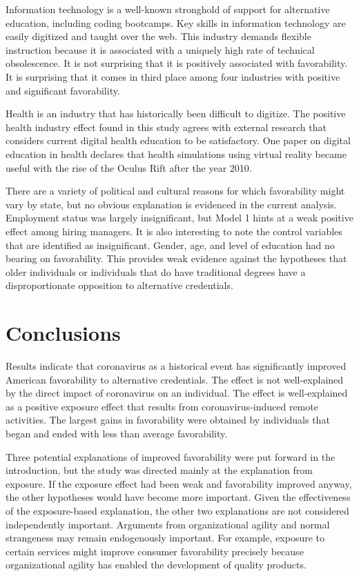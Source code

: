 \documentclass[review]{elsarticle}
\begin{document}
Information technology is a well-known stronghold of support for alternative education, including coding bootcamps.
Key skills in information technology are easily digitized and taught over the web.
This industry demands flexible instruction because it is associated with a uniquely high rate of technical obsolescence.
It is not surprising that it is positively associated with favorability.
It is surprising that it comes in third place among four industries with positive and significant favorability.

Health is an industry that has historically been difficult to digitize.
The positive health industry effect found in this study
agrees with external research that considers current digital health education to be satisfactory.
One paper on digital education in health declares that health simulations using virtual reality
became useful with the rise of the Oculus Rift after the year 2010\cite{giuseppe2015new}.

There are a variety of political and cultural reasons for which favorability might vary by state,
but no obvious explanation is evidenced in the current analysis.
Employment status was largely insignificant,
but Model 1 hints at a weak positive effect among hiring managers.
It is also interesting to note the control variables that are identified as insignificant.
Gender, age, and level of education had no bearing on favorability.
This provides weak evidence against the hypotheses that older individuals
or individuals that do have traditional degrees have a disproportionate opposition to alternative credentials.

\section{Conclusions}

Results indicate that coronavirus as a historical event has significantly improved American favorability to alternative credentials.
The effect is not well-explained by the direct impact of coronavirus on an individual.
The effect is well-explained as a positive exposure effect that results from coronavirus-induced remote activities.
The largest gains in favorability were obtained by individuals that began and ended with less than average favorability.

Three potential explanations of improved favorability were put forward in the introduction,
but the study was directed mainly at the explanation from exposure.
If the exposure effect had been weak and favorability improved anyway, the other hypotheses would have become more important.
Given the effectiveness of the exposure-based explanation, the other two explanations are not considered independently important.
Arguments from organizational agility and normal strangeness may remain endogenously important.
For example, exposure to certain services might improve consumer favorability precisely because
organizational agility has enabled the development of quality products.
\end{document}
